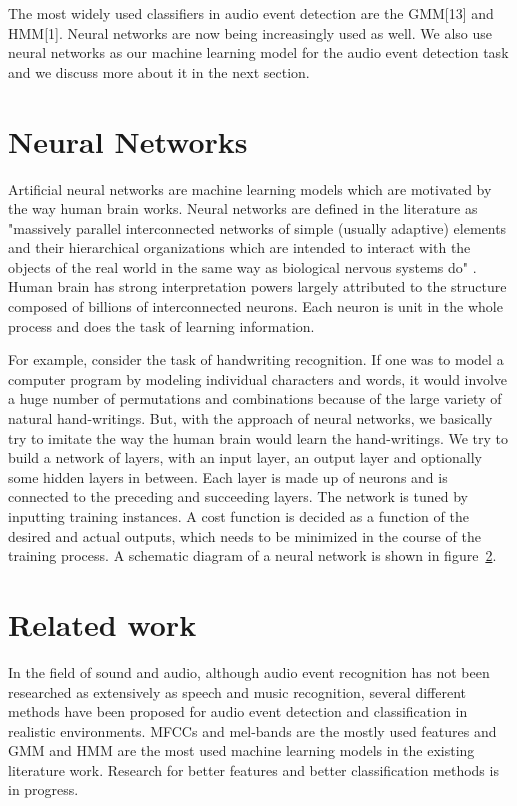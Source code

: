 The most widely used classifiers in audio event detection are the GMM[13] and HMM[1]. Neural networks are now being increasingly used as well. We also use neural networks as our machine learning model for the audio event detection task and we discuss more about it in the next section.

\section{Neural Networks}
Artificial neural networks are machine learning models which are motivated by the way human brain works. Neural networks are defined in the literature as "massively parallel interconnected networks of simple (usually adaptive) elements and their hierarchical organizations which are intended to interact with the objects of the real world in the same way as biological nervous systems do" \cite{kohonen1987state} \cite{haykin2004comprehensive}. Human brain has strong interpretation powers largely attributed to the structure composed of billions of interconnected neurons. Each neuron is unit in the whole process and does the task of learning information.

For example, consider the task of handwriting recognition. If one was to model a computer program by modeling individual characters and words, it would involve a huge number of permutations and combinations because of the large variety of natural hand-writings. But, with the approach of neural networks, we basically try to imitate the way the human brain would learn the hand-writings. We try to build a network of layers, with an input layer, an output layer and optionally some hidden layers in between. Each layer is made up of neurons and is connected to the preceding and succeeding layers. The network is tuned by inputting training instances. A cost function is decided as a function of the desired and actual outputs, which needs to be minimized in the course of the training process. A schematic diagram of a neural network is shown in figure~\ref{}.

\section{Related work}
In the field of sound and audio, although audio event recognition has not been researched as extensively as speech and music recognition, several different methods have been proposed for audio event detection and classification in realistic environments. MFCCs and mel-bands are the mostly used features and GMM and HMM are the most used machine learning models in the existing literature work. Research for better features and better classification methods is in progress.

